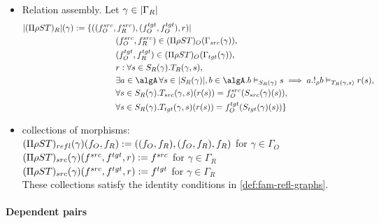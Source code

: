 \documentclass[12pt,a4paper]{article}
\def\src{_{src}}\alwaysmath{src}
\def\rfl{_{refl}}\alwaysmath{rfl}
\def\tgt{_{tgt}}\alwaysmath{tgt}
\renewcommand{\O}{_{O}}\alwaysmath{O}
\def\R{_{R}}\alwaysmath{R}
\begin{document}
\begin{itemize}[noitemsep]
   \item Relation assembly. Let $\gamma \in \carr{\Gamma\R}$
     \begin{align*}
       |(\Pi \rho S T)\R|(\gamma) \define \{( (f\O^{src},& \, f\R^{src}), (f\O^{tgt}, f\O^{tgt}), r)  | \\
       & (f\O^{src},f\R^{src}) \in (\Pi\rho S T)\O(\Gamma\src(\gamma)),\\
       & (f\O^{tgt},f\R^{tgt}) \in (\Pi\rho S T)\O(\Gamma\tgt(\gamma)),\\
       & r : \forall s \in S\R(\gamma). T\R(\gamma, s),\\
       & \exists a \in \algA\, \forall s \in \carr{S\R(\gamma)}, b \in \algA. b \vDash_{S\R(\gamma)} s \implies a . !_\rho b \vDash_{T\R(\gamma,s)} r(s),\\       
       & \forall s \in S\R(\gamma). T\src(\gamma, s)( r (s)) = f\O^{src}(S\src(\gamma)(s)),\\
       & \forall s \in S\R(\gamma). T\tgt(\gamma, s)( r (s)) = f\O^{tgt}(S\tgt(\gamma)(s)) \}
     \end{align*}
   \item collections of morphisms:\\
   $(\Pi \rho S T)\rfl(\gamma)(f\O, f\R) \define ((f\O, f\R), (f\O, f\R), f\R)$ for $\gamma \in \Gamma\O$\\
   $(\Pi \rho S T)\src(\gamma)(f^{src}, f^{tgt}, r) \define f^{src}$ for $\gamma \in \Gamma\R$ \\
   $(\Pi \rho S T)\src(\gamma)(f^{src}, f^{tgt}, r) \define f^{tgt}$ for $\gamma \in \Gamma\R$ \\
   These collections satisfy the identity conditions in \cref{def:fam-refl-graphs}.
\end{itemize}

\paragraph{Dependent pairs}
\end{document}
